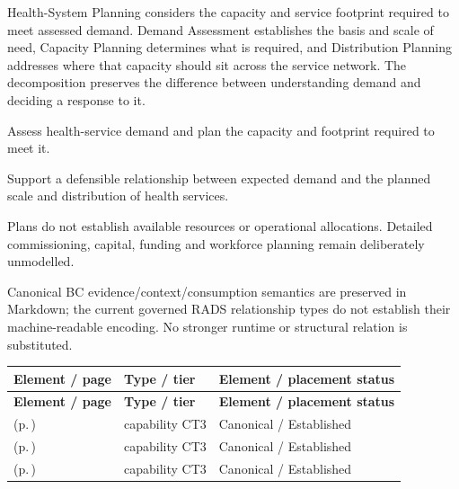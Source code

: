 Health-System Planning considers the capacity and service footprint required to meet assessed demand. Demand Assessment establishes the basis and scale of need, Capacity Planning determines what is required, and Distribution Planning addresses where that capacity should sit across the service network. The decomposition preserves the difference between understanding demand and deciding a response to it.



Assess health-service demand and plan the capacity and footprint required to meet it.



Support a defensible relationship between expected demand and the planned scale and distribution of health services.



Plans do not establish available resources or operational allocations. Detailed commissioning, capital, funding and workforce planning remain deliberately unmodelled.



Canonical BC evidence/\allowbreak{}context/\allowbreak{}consumption semantics are preserved in Markdown; the current governed RADS relationship types do not establish their machine-readable encoding. No stronger runtime or structural relation is substituted.


\begingroup\small\setlength{\TableWidth}{\dimexpr\linewidth-6\tabcolsep-4\arrayrulewidth\relax}
\begin{longtable}{|>{\raggedright\arraybackslash}p{0.52\TableWidth}|>{\raggedright\arraybackslash}p{0.2\TableWidth}|>{\raggedright\arraybackslash}p{0.28\TableWidth}|}
\hline\rowcolor{TableHead}\textbf{Element / page} & \textbf{Type / tier} & \textbf{Element / placement status}\\\hline\endfirsthead
\hline\rowcolor{TableHead}\textbf{Element / page} & \textbf{Type / tier} & \textbf{Element / placement status}\\\hline\endhead
\hline\endfoot
\nameref{cap:bc-health-service-demand-assessment} (p.\,\pageref{cap:bc-health-service-demand-assessment}) & capability CT3 & Canonical / Established\\\hline
\nameref{cap:bc-health-service-capacity-planning} (p.\,\pageref{cap:bc-health-service-capacity-planning}) & capability CT3 & Canonical / Established\\\hline
\nameref{cap:bc-health-service-distribution-planning} (p.\,\pageref{cap:bc-health-service-distribution-planning}) & capability CT3 & Canonical / Established\\\hline
\end{longtable}\endgroup

